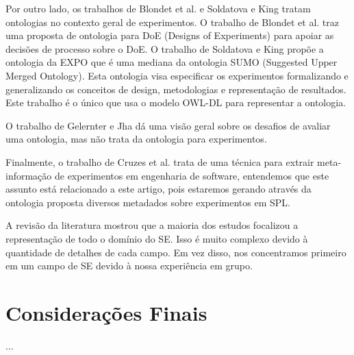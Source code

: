 Por outro lado, os trabalhos de Blondet et al. \cite{blondet2016ode} e Soldatova e King \cite{soldatova2006ontology} tratam ontologias no contexto geral de experimentos. O trabalho de Blondet et al. \cite{blondet2016ode} traz uma proposta de ontologia para DoE (Designs of Experiments) para apoiar as decisões de processo sobre o DoE. O trabalho de Soldatova e King \cite{soldatova2006ontology} propõe a ontologia da EXPO que é uma mediana da ontologia SUMO (Suggested Upper Merged Ontology). Esta ontologia visa especificar os experimentos formalizando e generalizando os conceitos de design, metodologias e representação de resultados. Este trabalho é o único que usa o modelo OWL-DL para representar a ontologia.

O trabalho de Gelernter e Jha \cite{gelernter2016challenges} dá uma visão geral sobre os desafios de avaliar uma ontologia, mas não trata da ontologia para experimentos.

Finalmente, o trabalho de Cruzes et al. \cite{cruzes2007extracting} trata de uma técnica para extrair meta-informação de experimentos em engenharia de software, entendemos que este assunto está relacionado a este artigo, pois estaremos gerando através da ontologia proposta diversos metadados sobre experimentos em SPL.

A revisão da literatura mostrou que a maioria dos estudos focalizou a representação de todo o domínio do SE. Isso é muito complexo devido à quantidade de detalhes de cada campo. Em vez disso, nos concentramos primeiro em um campo de SE devido à nossa experiência em grupo.


\section{Considerações Finais}
\label{sec:concidaracoes_finais}

...